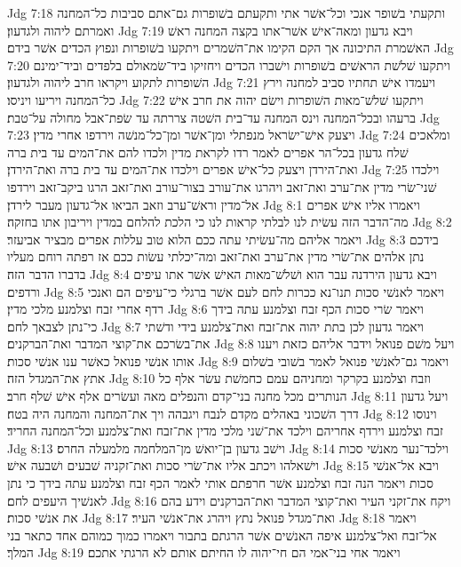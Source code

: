 Jdg 7:18  ותקעתי בשׁופר אנכי וכל־אשׁר אתי ותקעתם בשׁופרות גם־אתם סביבות כל־המחנה ואמרתם ליהוה ולגדעון׃
Jdg 7:19  ויבא גדעון ומאה־אישׁ אשׁר־אתו בקצה המחנה ראשׁ האשׁמרת התיכונה אך הקם הקימו את־השׁמרים ויתקעו בשׁופרות ונפוץ הכדים אשׁר בידם׃
Jdg 7:20  ויתקעו שׁלשׁת הראשׁים בשׁופרות וישׁברו הכדים ויחזיקו ביד־שׂמאולם בלפדים וביד־ימינם השׁופרות לתקוע ויקראו חרב ליהוה ולגדעון׃
Jdg 7:21  ויעמדו אישׁ תחתיו סביב למחנה וירץ כל־המחנה ויריעו ויניסו׃
Jdg 7:22  ויתקעו שׁלשׁ־מאות השׁופרות וישׂם יהוה את חרב אישׁ ברעהו ובכל־המחנה וינס המחנה עד־בית השׁטה צררתה עד שׂפת־אבל מחולה על־טבת׃
Jdg 7:23  ויצעק אישׁ־ישׂראל מנפתלי ומן־אשׁר ומן־כל־מנשׁה וירדפו אחרי מדין׃
Jdg 7:24  ומלאכים שׁלח גדעון בכל־הר אפרים לאמר רדו לקראת מדין ולכדו להם את־המים עד בית ברה ואת־הירדן ויצעק כל־אישׁ אפרים וילכדו את־המים עד בית ברה ואת־הירדן׃
Jdg 7:25  וילכדו שׁני־שׂרי מדין את־ערב ואת־זאב ויהרגו את־עורב בצור־עורב ואת־זאב הרגו ביקב־זאב וירדפו אל־מדין וראשׁ־ערב וזאב הביאו אל־גדעון מעבר לירדן׃
Jdg 8:1  ויאמרו אליו אישׁ אפרים מה־הדבר הזה עשׂית לנו לבלתי קראות לנו כי הלכת להלחם במדין ויריבון אתו בחזקה׃
Jdg 8:2  ויאמר אליהם מה־עשׂיתי עתה ככם הלוא טוב עללות אפרים מבציר אביעזר׃
Jdg 8:3  בידכם נתן אלהים את־שׂרי מדין את־ערב ואת־זאב ומה־יכלתי עשׂות ככם אז רפתה רוחם מעליו בדברו הדבר הזה׃
Jdg 8:4  ויבא גדעון הירדנה עבר הוא ושׁלשׁ־מאות האישׁ אשׁר אתו עיפים ורדפים׃
Jdg 8:5  ויאמר לאנשׁי סכות תנו־נא ככרות לחם לעם אשׁר ברגלי כי־עיפים הם ואנכי רדף אחרי זבח וצלמנע מלכי מדין׃
Jdg 8:6  ויאמר שׂרי סכות הכף זבח וצלמנע עתה בידך כי־נתן לצבאך לחם׃
Jdg 8:7  ויאמר גדעון לכן בתת יהוה את־זבח ואת־צלמנע בידי ודשׁתי את־בשׂרכם את־קוצי המדבר ואת־הברקנים׃
Jdg 8:8  ויעל משׁם פנואל וידבר אליהם כזאת ויענו אותו אנשׁי פנואל כאשׁר ענו אנשׁי סכות׃
Jdg 8:9  ויאמר גם־לאנשׁי פנואל לאמר בשׁובי בשׁלום אתץ את־המגדל הזה׃
Jdg 8:10  וזבח וצלמנע בקרקר ומחניהם עמם כחמשׁת עשׂר אלף כל הנותרים מכל מחנה בני־קדם והנפלים מאה ועשׂרים אלף אישׁ שׁלף חרב׃
Jdg 8:11  ויעל גדעון דרך השׁכוני באהלים מקדם לנבח ויגבהה ויך את־המחנה והמחנה היה בטח׃
Jdg 8:12  וינוסו זבח וצלמנע וירדף אחריהם וילכד את־שׁני מלכי מדין את־זבח ואת־צלמנע וכל־המחנה החריד׃
Jdg 8:13  וישׁב גדעון בן־יואשׁ מן־המלחמה מלמעלה החרס׃
Jdg 8:14  וילכד־נער מאנשׁי סכות וישׁאלהו ויכתב אליו את־שׂרי סכות ואת־זקניה שׁבעים ושׁבעה אישׁ׃
Jdg 8:15  ויבא אל־אנשׁי סכות ויאמר הנה זבח וצלמנע אשׁר חרפתם אותי לאמר הכף זבח וצלמנע עתה בידך כי נתן לאנשׁיך היעפים לחם׃
Jdg 8:16  ויקח את־זקני העיר ואת־קוצי המדבר ואת־הברקנים וידע בהם את אנשׁי סכות׃
Jdg 8:17  ואת־מגדל פנואל נתץ ויהרג את־אנשׁי העיר׃
Jdg 8:18  ויאמר אל־זבח ואל־צלמנע איפה האנשׁים אשׁר הרגתם בתבור ויאמרו כמוך כמוהם אחד כתאר בני המלך׃
Jdg 8:19  ויאמר אחי בני־אמי הם חי־יהוה לו החיתם אותם לא הרגתי אתכם׃
